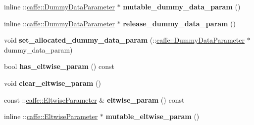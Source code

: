 \begin{DoxyCompactItemize}
\item 
\mbox{\label{classcaffe_1_1_v1_layer_parameter_a8bfae87d1b444316c6882721927e3c98}} 
inline \+::\mbox{\hyperlink{classcaffe_1_1_dummy_data_parameter}{caffe\+::\+Dummy\+Data\+Parameter}} $\ast$ {\bfseries mutable\+\_\+dummy\+\_\+data\+\_\+param} ()
\item 
\mbox{\label{classcaffe_1_1_v1_layer_parameter_af2d68fec6627d92de269cdd25e41f781}} 
inline \+::\mbox{\hyperlink{classcaffe_1_1_dummy_data_parameter}{caffe\+::\+Dummy\+Data\+Parameter}} $\ast$ {\bfseries release\+\_\+dummy\+\_\+data\+\_\+param} ()
\item 
\mbox{\label{classcaffe_1_1_v1_layer_parameter_a1463d1aa1e588be8feabd0cf71f1212c}} 
void {\bfseries set\+\_\+allocated\+\_\+dummy\+\_\+data\+\_\+param} (\+::\mbox{\hyperlink{classcaffe_1_1_dummy_data_parameter}{caffe\+::\+Dummy\+Data\+Parameter}} $\ast$dummy\+\_\+data\+\_\+param)
\item 
\mbox{\label{classcaffe_1_1_v1_layer_parameter_a5cf2168effced6bf934b951619b4e41a}} 
bool {\bfseries has\+\_\+eltwise\+\_\+param} () const
\item 
\mbox{\label{classcaffe_1_1_v1_layer_parameter_ac14bdfc8574470b615308f6526d93e64}} 
void {\bfseries clear\+\_\+eltwise\+\_\+param} ()
\item 
\mbox{\label{classcaffe_1_1_v1_layer_parameter_ab38f4e169c46263379346ff6f9c9637e}} 
const \+::\mbox{\hyperlink{classcaffe_1_1_eltwise_parameter}{caffe\+::\+Eltwise\+Parameter}} \& {\bfseries eltwise\+\_\+param} () const
\item 
\mbox{\label{classcaffe_1_1_v1_layer_parameter_a1d61c1e706228ccc275e546503a9f7d9}} 
inline \+::\mbox{\hyperlink{classcaffe_1_1_eltwise_parameter}{caffe\+::\+Eltwise\+Parameter}} $\ast$ {\bfseries mutable\+\_\+eltwise\+\_\+param} ()
\item 
\mbox{\label{classcaffe_1_1_v1_layer_parameter_a27c9bbd0bda92f1f41108eef6ed358af}} 

\end{DoxyCompactItemize}
